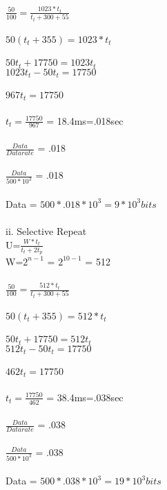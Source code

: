 \documentclass[a4paper,12pt]{article}
\begin{document}
$\frac{50}{100} = \frac{1023 * t_{t}}{t_{t}+300+55}$\\\\
$50(t_{t}+355)=1023* t_{t}$\\\\
$50t_{t} + 17750 = 1023t_{t}$\\
$1023t_{t}-50t_{t} = 17750$\\\\
$967t_{t}=17750$\\\\
$t_{t} = \frac{17750}{967}$ = 18.4ms=.018sec\\\\
$\frac{Data}{Datarate}$ = .018\\\\
$\frac{Data}{500*10^3}$ = .018\\\\
Data = $500*.018*10^3= 9* 10^3 bits$\\\\

ii. Selective Repeat\\
U=$\frac{W*t_{t}}{t_{t}+2t_{p}}$\\
W=$2^{n-1}$ = $2^{10-1}$ = 512\\\\
$\frac{50}{100} = \frac{512 * t_{t}}{t_{t}+300+55}$\\\\
$50(t_{t}+355)=512* t_{t}$\\\\
$50t_{t} + 17750 = 512t_{t}$\\
$512t_{t}-50t_{t} = 17750$\\\\
$462t_{t}=17750$\\\\
$t_{t} = \frac{17750}{462}$ = 38.4ms=.038sec\\\\
$\frac{Data}{Datarate}$ = .038\\\\
$\frac{Data}{500*10^3}$ = .038\\\\
Data = $500*.038*10^3= 19 * 10^3 bits$\\\\
\end{document}
